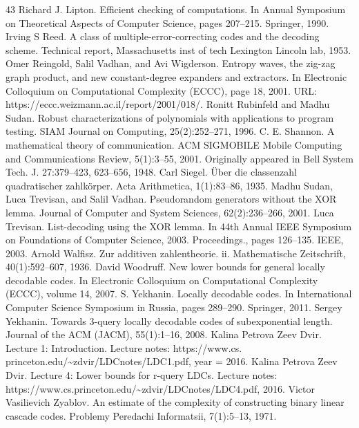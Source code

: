 \begin{thebibliography}{43}
Richard J. Lipton. Efficient checking of computations. In Annual Symposium on Theoretical Aspects of Computer Science, pages 207–215. Springer, 1990.
Irving S Reed. A class of multiple-error-correcting codes and the decoding scheme. Technical report, Massachusetts inst of tech Lexington Lincoln lab, 1953.
Omer Reingold, Salil Vadhan, and Avi Wigderson. Entropy waves, the zig-zag graph product, and new constant-degree expanders and extractors. In Electronic Colloquium on Computational Complexity (ECCC), page 18, 2001. URL: https://eccc.weizmann.ac.il/report/2001/018/.
Ronitt Rubinfeld and Madhu Sudan. Robust characterizations of polynomials with applications to program testing. SIAM Journal on Computing, 25(2):252–271, 1996.
C. E. Shannon. A mathematical theory of communication. ACM SIGMOBILE Mobile Computing and Communications Review, 5(1):3–55, 2001. Originally appeared in Bell System Tech. J. 27:379–423, 623–656, 1948.
Carl Siegel. Über die classenzahl quadratischer zahlkörper. Acta Arithmetica, 1(1):83–86, 1935.
Madhu Sudan, Luca Trevisan, and Salil Vadhan. Pseudorandom generators without the XOR lemma. Journal of Computer and System Sciences, 62(2):236–266, 2001.
Luca Trevisan. List-decoding using the XOR lemma. In 44th Annual IEEE Symposium on Foundations of Computer Science, 2003. Proceedings., pages 126–135. IEEE, 2003.
Arnold Walfisz. Zur additiven zahlentheorie. ii. Mathematische Zeitschrift, 40(1):592–607, 1936.
David Woodruff. New lower bounds for general locally decodable codes. In Electronic Colloquium on Computational Complexity (ECCC), volume 14, 2007.
S. Yekhanin. Locally decodable codes. In International Computer Science Symposium in Russia, pages 289–290. Springer, 2011.
Sergey Yekhanin. Towards 3-query locally decodable codes of subexponential length. Journal of the ACM (JACM), 55(1):1–16, 2008.
Kalina Petrova Zeev Dvir. Lecture 1: Introduction. Lecture notes: https://www.cs. princeton.edu/\textasciitilde{}zdvir/LDCnotes/LDC1.pdf, year = 2016.
Kalina Petrova Zeev Dvir. Lecture 4: Lower bounds for r-query LDCs. Lecture notes: https://www.cs.princeton.edu/\textasciitilde{}zdvir/LDCnotes/LDC4.pdf, 2016.
Victor Vasilievich Zyablov. An estimate of the complexity of constructing binary linear cascade codes. Problemy Peredachi Informatsii, 7(1):5–13, 1971.
\end{thebibliography}
